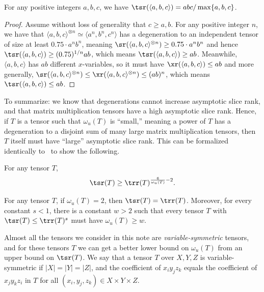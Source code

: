 \documentclass{toc}
\begin{document}
\begin{corollary} \label{cortopropthree}
For any positive integers $a,b,c$, we have $\tsr(\langle a,b,c \rangle) = abc / \max \{a,b,c\}$.
\end{corollary}
\begin{proof}
Assume without loss of generality that $c \geq a,b$. For any positive integer $n$, we have that $\langle a,b,c \rangle^{\otimes n} \simeq \langle a^n, b^n, c^n \rangle$ has a degeneration to an independent tensor of size at least $0.75 \cdot a^n b^n$, meaning $\sr(\langle a,b,c \rangle^{\otimes n}) \geq 0.75 \cdot a^n b^n$ and hence $\tsr(\langle a,b,c \rangle) \geq (0.75)^{1/n} ab$, which means $\tsr(\langle a,b,c \rangle) \geq  ab$. Meanwhile, $\langle a,b,c \rangle$ has $ab$ different $x$-variables, so it must have $\xr(\langle a,b,c \rangle) \leq ab$ and more generally, $\sr(\langle a,b,c \rangle^{\otimes n}) \leq \xr(\langle a,b,c \rangle^{\otimes n}) \leq (ab)^n$, which means $\tsr(\langle a,b,c \rangle) \leq  ab$.
\end{proof}

To summarize: we know that degenerations cannot increase asymptotic slice rank, and that matrix multiplication tensors have a high asymptotic slice rank. Hence, if $T$ is a tensor such that $\omega_u(T)$ is ``small,'' meaning a power of $T$ has a degeneration to a disjoint sum of many large matrix multiplication tensors, then $T$ itself must have ``large'' asymptotic slice rank. This can be formalized identically to~\cite[Theorem~4.1 and Corollary~4.3]{aw}
%
to show the following.

\begin{theorem} \label{thm:SROmega}
For any tensor $T$, $$\tsr(T) \geq \trr(T)^{\frac{6}{\omega_u(T)} - 2}.$$
\end{theorem}

\begin{corollary} \label{cor:omegaands}
For any tensor $T$, if $\omega_u(T)=2$, then $\tsr(T) = \trr(T)$. Moreover, for every constant $s<1$, there is a constant $w>2$ such that every tensor $T$ with $\tsr(T) \leq \trr(T)^s$ must have $\omega_u(T) \geq w$.
\end{corollary}

Almost all the tensors we consider in this note are \emph{variable-symmetric} tensors, and for these tensors $T$ we can get a better lower bound on $\omega_u(T)$ from an upper bound on $\tsr(T)$. We say that a tensor $T$ over $X,Y,Z$ is variable-symmetric if $|X|=|Y|=|Z|$, and the coefficient of $x_i y_j z_k$ equals the coefficient of $x_j y_k z_i$ in $T$ for all $(x_i, y_j, z_k) \in X \times Y \times Z$.
\end{document}
